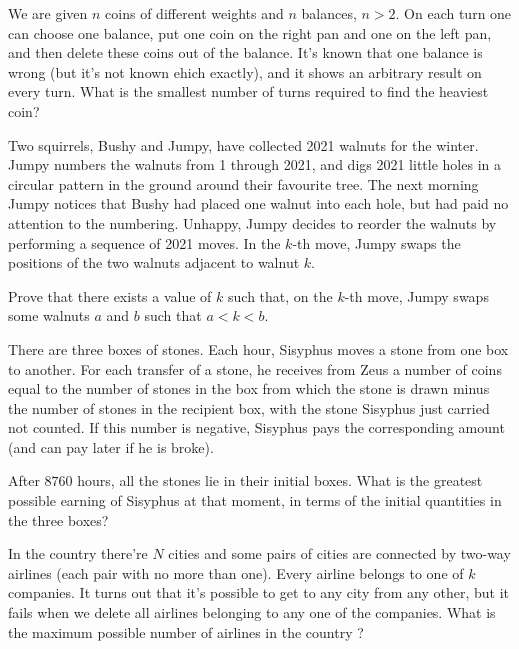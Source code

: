 \documentclass[11pt]{scrartcl}
\begin{document}
\begin{problem}[2211812924503059239]
	We are given $n$ coins of different weights and $n$ balances, $n>2$. On each turn one can choose one balance, put one coin on the right pan and one on the left pan, and then delete these coins out of the balance. It's known that one balance is wrong (but it's not known ehich exactly), and it shows an arbitrary result on every turn. What is the smallest number of turns required to find the heaviest coin?
\end{problem}
\begin{problem}[669395675904242]
	Two squirrels, Bushy and Jumpy, have collected 2021 walnuts for the winter. Jumpy numbers the walnuts from 1 through 2021, and digs 2021 little holes in a circular pattern in the ground around their favourite tree. The next morning Jumpy notices that Bushy had placed one walnut into each hole, but had paid no attention to the numbering. Unhappy, Jumpy decides to reorder the walnuts by performing a sequence of 2021 moves. In the $k$-th move, Jumpy swaps the positions of the two walnuts adjacent to walnut $k$.

Prove that there exists a value of $k$ such that, on the $k$-th move, Jumpy swaps some walnuts $a$ and $b$ such that $a<k<b$.
\end{problem}
\begin{problem}[796313598765903]
  There are three boxes of stones.
  Each hour, Sisyphus moves a stone from one box to another.
  For each transfer of a stone, he receives from Zeus a number of coins
  equal to the number of stones in the box from which the stone is drawn
  minus the number of stones in the recipient box,
  with the stone Sisyphus just carried not counted.
  If this number is negative, Sisyphus pays the corresponding amount
  (and can pay later if he is broke).

  After $8760$ hours, all the stones lie in their initial boxes.
  What is the greatest possible earning of Sisyphus at that moment,
  in terms of the initial quantities in the three boxes?
\end{problem}
\begin{problem}[697045850918084]
	In the country there're $N$ cities and some pairs of cities are connected by two-way airlines (each pair with no more than one). Every airline belongs to one of $k$ companies. It turns out that it's possible to get to any city from any other, but it fails when we delete all airlines belonging to any one of the companies. What is the maximum possible number of airlines in the country ?
\end{problem}
\end{document}
